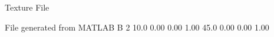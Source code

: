 Texture File

File generated from MATLAB
B 2
   10.0   0.00   0.00  1.00
   45.0   0.00   0.00  1.00
